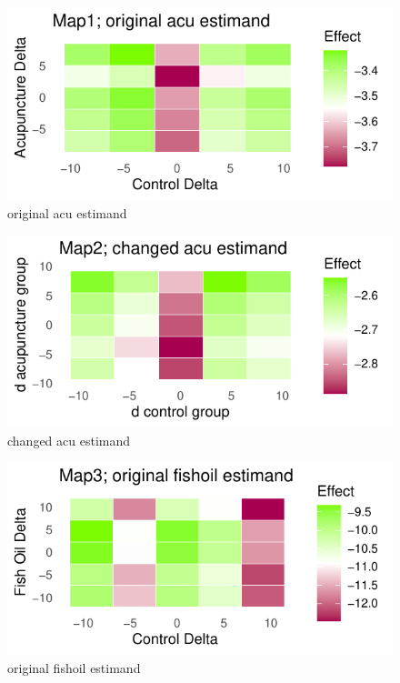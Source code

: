 \documentclass{article}
\newcommand{\pandocbounded}[1]{#1}
\begin{document}
\newpage

\begin{figure}
\centering
\pandocbounded{\includegraphics[keepaspectratio]{Final_Report_files/figure-latex/unnamed-chunk-38-1.pdf}}
\caption{original acu estimand}
\end{figure}

\begin{figure}
\centering
\pandocbounded{\includegraphics[keepaspectratio]{Final_Report_files/figure-latex/unnamed-chunk-39-1.pdf}}
\caption{changed acu estimand}
\end{figure}

\begin{figure}
\centering
\pandocbounded{\includegraphics[keepaspectratio]{Final_Report_files/figure-latex/unnamed-chunk-40-1.pdf}}
\caption{original fishoil estimand}
\end{figure}
\end{document}

